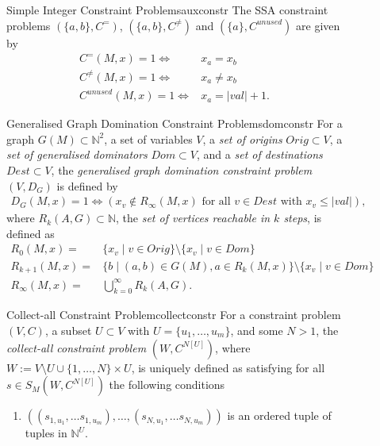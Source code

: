 \begin{figure}[p]
    \begin{definition}{Simple Integer Constraint Problems}{auxconstr}
        The SSA constraint problems $(\{a,b\}, C^=)$, $(\{a,b\}, C^{\neq})$
        and $(\{a\}, C^{unused})$ are given by
        \begin{align*}
        C^=(M,x)=1\iff{}&x_a=x_b\\
        C^{\neq}(M,x)=1\iff{}&x_a\neq x_b\\
        C^{unused}(M,x)=1\iff{}&x_a=|val|+1.
        \end{align*}
    \end{definition}
    \begin{definition}{Generalised Graph Domination Constraint Problems}{domconstr}
        For a graph $G(M)\subset\mathbb N^2$, a set of variables $V$,
        a {\it set of origins} $Orig\subset V$,
        a {\it set of generalised dominators} $Dom\subset V$, and
        a {\it set of destinations} $Dest\subset V$, the
        {\em generalised graph domination constraint problem}
        $(V,D_G)$ is defined by
        \begin{align*}
            D_G(M,x)=1\iff(x_v\notin R_{\infty}(M,x)\text{ for all }v\in Dest\text{ with }x_v\leq |val|),
        \end{align*}
        where $R_k(A,G)\subset\mathbb N$, the {\it set of vertices reachable in $k$ steps},
        is defined as
        \begin{align*}
            R_0(M,x)={}&\{x_v\mid v\in Orig\}\setminus\{x_v\mid v\in Dom\}\\
            R_{k+1}(M,x)={}&\{b\mid (a,b)\in G(M),a\in R_k(M,x)\}\setminus\{x_v\mid v\in Dom\}\\
            R_\infty(M,x)={}&\bigcup_{k=0}^\infty R_k(A,G).
        \end{align*}
    \end{definition}
    \begin{definition}{Collect-all Constraint Problem}{collectconstr}
        For a constraint problem $(V,C)$, a subset $U\subset V$ with
        $U=\{u_1,\dots,u_m\}$, and some $N>1$, the
        {\em collect-all constraint problem} $(W, C^{N[U]})$, where
        $W:=V\setminus U\cup\{1,\dots,N\}\times U$, is uniquely defined
        as satisfying for all $s\in S_M(W,C^{N[U]})$ the following conditions
        \begin{enumerate}
        \item $((s_{1,u_1},\dots s_{1,u_m}),\dots,(s_{N,u_1},\dots s_{N,u_m}))$ is an ordered tuple of tuples in $\mathbb N^U$.

\end{enumerate}
\end{definition}
\end{figure}
